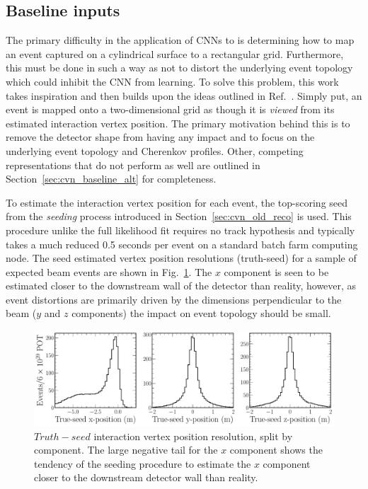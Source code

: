 \subsection{Baseline inputs} %
\label{sec:cvn_baseline_inputs} %

The primary difficulty in the application of CNNs to \chips is determining how to map an event
captured on a cylindrical surface to a rectangular grid. Furthermore, this must be done in such a
way as not to distort the underlying event topology which could inhibit the CNN from learning. To
solve this problem, this work takes inspiration and then builds upon the ideas outlined in
Ref.~\cite{theodore2016}. Simply put, an event is mapped onto a two-dimensional grid as though it
is \emph{viewed} from its estimated interaction vertex position. The primary motivation behind
this is to remove the detector shape from having any impact and to focus on the underlying event
topology and Cherenkov profiles. Other, competing representations that do not perform as well are
outlined in Section~\ref{sec:cvn_baseline_alt} for completeness.

To estimate the interaction vertex position for each event, the top-scoring seed from the
\emph{seeding} process introduced in Section~\ref{sec:cvn_old_reco} is used. This procedure unlike
the full likelihood fit requires no track hypothesis and typically takes a much reduced 0.5
seconds per event on a standard batch farm computing node. The seed estimated vertex position
resolutions (truth-seed) for a sample of expected beam events are shown in
Fig.~\ref{fig:explore_true_reco_vtx}. The $x$ component is seen to be estimated closer to the
downstream wall of the detector than reality, however, as event distortions are primarily driven
by the dimensions perpendicular to the beam ($y$ and $z$ components) the impact on event topology
should be small.

\begin{figure} %
    \includegraphics[width=\textwidth]{diagrams/6-cvn/chipsnet/explore_true_reco_vtx.pdf}
    \caption[Seed interaction vertex resolutions.]
    {$Truth - seed$ interaction vertex position resolution, split by component. The large negative
        tail for the $x$ component shows the tendency of the seeding procedure to estimate the $x$
        component closer to the downstream detector wall than reality.}
    \label{fig:explore_true_reco_vtx}
\end{figure}

